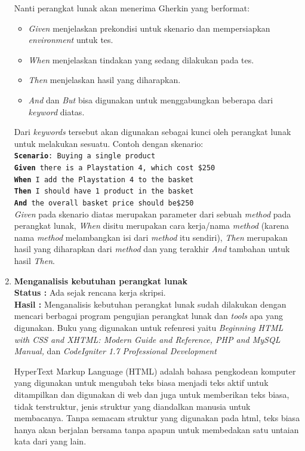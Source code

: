 \documentclass[a4paper,twoside]{article}
\begin{document}
\begin{enumerate}
Nanti perangkat lunak akan menerima Gherkin yang berformat:
\begin{itemize}
 \item \textit{Given} menjelaskan prekondisi untuk skenario dan mempersiapkan \textit{environment} untuk tes.
 \item \textit{When} menjelaskan tindakan yang sedang dilakukan pada tes.
 \item \textit{Then} menjelaskan hasil yang diharapkan.
 \item \textit{And} dan \textit{But} bisa digunakan untuk menggabungkan beberapa dari \textit{keyword} diatas.
\end{itemize}
Dari \textit{keywords} tersebut akan digunakan sebagai kunci oleh perangkat lunak untuk melakukan sesuatu. Contoh dengan skenario:\\
\texttt{\textbf{Scenario}: Buying a single product\\
\textbf{Given} there is a Playstation 4, which cost \$250\\
\textbf{When} I add the Playstation 4 to the basket\\
\textbf{Then} I should have 1 product in the basket\\
\textbf{And} the overall basket price should be\$250\\}
\textit{Given} pada skenario diatas merupakan parameter dari sebuah \textit{method} pada perangkat lunak, \textit{When} disitu merupakan cara kerja/nama \textit{method} (karena nama \textit{method} melambangkan isi dari \textit{method} itu sendiri),  \textit{Then} merupakan hasil yang diharapkan dari \textit{method} dan yang terakhir \textit{And} tambahan untuk hasil \textit{Then}. 
		\item \textbf{Menganalisis kebutuhan perangkat lunak}\\
		{\bf Status :} Ada sejak rencana kerja skripsi.\\
		{\bf Hasil :} Menganalisis kebutuhan perangkat lunak sudah dilakukan dengan mencari berbagai program pengujian perangkat lunak dan \textit{tools} apa yang digunakan. Buku yang digunakan untuk refenresi yaitu \textit{Beginning HTML with CSS and XHTML: Modern Guide and Reference, PHP and MySQL Manual,} dan \textit{CodeIgniter 1.7 Professional 
Development}

HyperText Markup Language (HTML) adalah bahasa pengkodean komputer yang digunakan untuk mengubah teks biasa menjadi teks aktif untuk ditampilkan dan digunakan di web dan juga untuk memberikan teks biasa, tidak terstruktur, jenis struktur yang diandalkan manusia untuk membacanya. Tanpa semacam struktur yang digunakan pada html, teks biasa hanya akan berjalan bersama tanpa apapun untuk membedakan satu untaian kata dari yang lain.


\end{enumerate}
\end{document}
